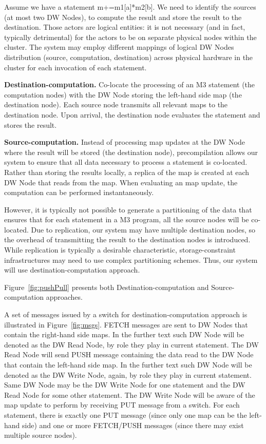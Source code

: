 \documentclass{sig-semester}
\def\M3{M3\xspace}
\begin{document}
Assume we have a statement m+=m1[a]*m2[b]. We need to identify the sources (at most two DW Nodes), to compute the result and store the result to the destination. Those actors are logical entities: it is not necessary (and in fact, typically detrimental) for the actors to be on separate physical nodes within the cluster. The system may employ different mappings of logical DW Nodes distribution (source, computation, destination) across physical hardware in the cluster for each invocation of each statement.

\textbf{Destination-computation.}
Co-locate the processing of an \M3 statement (the computation nodes) with the DW Node storing the left-hand side map (the destination node). Each source node transmits all relevant maps to the destination node. Upon arrival, the destination node evaluates the statement and stores the result.

\textbf{Source-computation.} Instead of processing map updates at the DW Node where the result will be stored (the destination node), precompilation allows our system to ensure that all data necessary to process a statement is co-located. Rather than storing the results locally, a replica of the map is created at each DW Node that reads from the map. When evaluating an map update, the computation can be performed instantaneously.

However, it is typically not possible to generate a partitioning of the data that ensures that for each statement in a \M3 program, all the source nodes will be co-located. Due to replication, our system may have multiple destination nodes, so the overhead of transmitting the result to the destination nodes is introduced. While replication is typically a desirable characteristic, storage-constraint infrastructures may need to use complex partitioning schemes. Thus, our system will use destination-computation approach.

Figure~\ref{fig:pushPull} presents both Destination-computation and Source-computation approaches.

A set of messages issued by a switch for destination-computation approach is illustrated in Figure~\ref{fig:msgs}. FETCH messages are sent to DW Nodes that contain the right-hand side maps. In the further text such DW Node will be denoted as the DW Read Node, by role they play in current statement. The DW Read Node will send PUSH message containing the data read to the DW Node that contain the left-hand side map. In the further text such DW Node will be denoted as the DW Write Node, again, by role they play in current statement. Same DW Node may be the DW Write Node for one statement and the DW Read Node for some other statement. The DW Write Node will be aware of the map update to perform by receiving PUT message from a switch. For each statement, there is exactly one PUT message (since only one map can be the left-hand side) and one or more FETCH/PUSH messages (since there may exist multiple source nodes).
\end{document}
